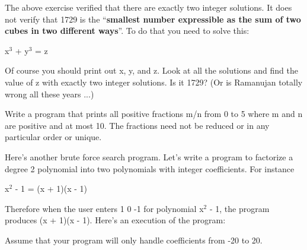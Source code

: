 \begin{console}
\begin{ex} The above exercise verified that there are exactly
two integer solutions. It does not verify that 1729 is the
``\textbf{smallest number expressible as the sum of two cubes in two
different ways}''. To do that you need to solve this:
\begin{center}
x$^3$ + y$^3$ = z
\end{center}
Of course you should print out x, y, and z. Look at all the solutions
and find the value of z with exactly two integer solutions. Is it 1729?
(Or is Ramanujan totally wrong all these years ...)
\end{ex}
\begin{ex}
Write a program that prints all positive fractions m/n from 0
to 5 where m and n are positive and at most 10. The fractions need not
be reduced or in any particular order or unique.
\end{ex}

\newpage{}

Here's another brute force search program.
Let's write a program to factorize a degree 2 polynomial
into two polynomials with integer coefficients. For instance
\begin{center}
x$^2$ - 1 = (x + 1)(x - 1)
\end{center}
Therefore when the user enters 1 0 -1 for polynomial
x$^2$ - 1, the program produces (x + 1)(x - 1).
Here's an execution of the program:
Assume that your program will only handle coefficients from -20 to 20.


\end{console}
